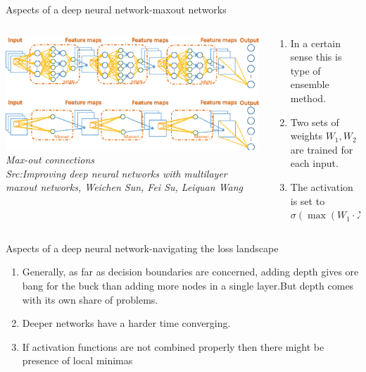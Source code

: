 \begin{frame}{Aspects of a deep neural network-maxout networks }
	\begin{columns}[T]
        \begin{column}{0.4\textwidth}
        	\includegraphics[width=\textwidth]{images/maxout.png}
			\tiny{\textit{Max-out connections\\ Src:Improving deep neural networks with multilayer maxout networks, Weichen Sun, Fei Su, Leiquan Wang}}
        \end{column}
	    \begin{column}{0.6\textwidth} 
			\begin{enumerate}[$\bullet$]
				\item In a certain sense this is type of ensemble method.\pause
				\item Two sets of weights $W_1,W_2$ are trained for each input.
				\item The activation is set to $\sigma\left(\max(W_1\cdot X_{in},W_2\cdot X_{in})+b_0\right)$
			\end{enumerate}
    	\end{column}
    \end{columns}
\end{frame}

\begin{frame}{Aspects of a deep neural network-navigating the loss landscape}
	\begin{enumerate}[$\bullet$]
		\item Generally, as far as decision boundaries are concerned, adding depth gives ore bang for the buck than adding more nodes in a single layer.\pause But depth comes with its own share of problems.\pause
		\item Deeper networks have a harder time converging.\pause
		\item If activation functions are not combined properly then there might be presence of local minimas
	\end{enumerate}
\end{frame}
